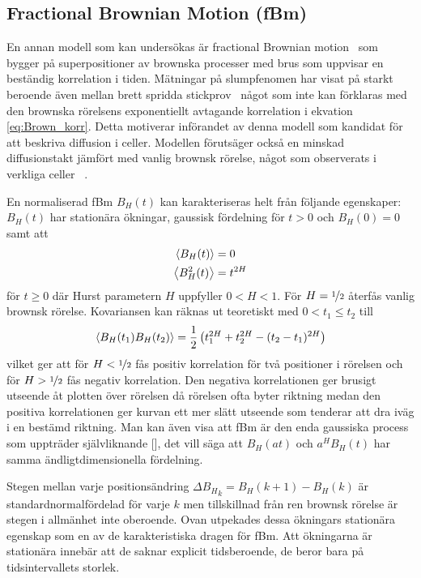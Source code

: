 

\subsection{Fractional Brownian Motion (fBm)}

En annan modell som kan undersökas är fractional Brownian motion~\cite{Mandelbrot_fBm1968} som bygger på superpositioner av brownska processer med brus som uppvisar en beständig korrelation i tiden. Mätningar på slumpfenomen har visat på starkt beroende även mellan brett spridda stickprov~\cite{Mandelbrot_fBm1968} något som inte kan förklaras med den brownska rörelsens exponentiellt avtagande korrelation i ekvation \eqref{eq:Brown_korr}. Detta motiverar införandet av denna modell som kandidat för att beskriva   diffusion i celler. Modellen förutsäger också en minskad diffusionstakt jämfört med vanlig brownsk rörelse, något som observerats i verkliga celler ~\cite{Hofling&Franosch2013}.

En normaliserad fBm $B_H(t)$ kan karakteriseras helt från följande egenskaper\cite{Dieker_fBm}: $B_H(t)$ har stationära ökningar, gaussisk fördelning för $t>0$ och $B_H(0)=0$ samt att
\begin{align}
    \ev{B_H(t)}&=0 \\
    \ev{B^2_H(t)}&=t^{2H}
\end{align}
för $t\geq 0$ där Hurst parametern $H$ uppfyller $0< H <1$. För $H=\nicefrac{1}{2}$ återfås vanlig brownsk rörelse. Kovariansen kan räknas ut teoretiskt med $0<
t_1\leq t_2$ till
\begin{equation}
\ev{B_H(t_1)B_H(t_2)}
= \frac{1}{2} \left(t_1^{2H}+t_2^{2H}-(t_2-t_1)^{2H}\right)
\end{equation}
vilket ger att för $H<\nicefrac{1}{2}$ fås positiv korrelation för två positioner i rörelsen och för  $H>\nicefrac{1}{2}$ fås negativ korrelation. Den negativa korrelationen ger brusigt utseende åt plotten över rörelsen då rörelsen ofta byter riktning medan den positiva korrelationen ger kurvan ett mer slätt utseende som tenderar att dra iväg i en bestämd riktning. Man kan även visa att fBm är den enda gaussiska process som uppträder självliknande [], det vill säga att $B_H(at)$ och $a^H B_H(t)$ har samma ändligtdimensionella fördelning.

Stegen mellan varje positionsändring $\Delta{B_H}_k=B_H(k+1)-B_H(k)$ är standardnormalfördelad för varje $k$ men tillskillnad från ren brownsk rörelse är stegen i allmänhet inte oberoende. Ovan utpekades dessa ökningars stationära egenskap som en av de karakteristiska dragen för fBm. Att ökningarna är stationära innebär att de saknar explicit tidsberoende, de beror bara på tidsintervallets storlek.

